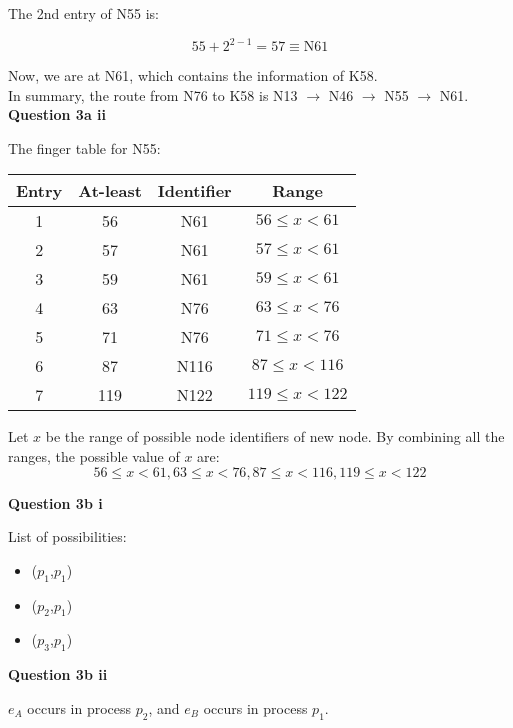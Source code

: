 \documentclass[11pt,a4paper]{report}
\begin{document}
\begin{multicols*}{2}
\noindent The 2nd entry of N55 is:

$$55 + 2^{2-1} = 57 \equiv \text{N61}$$

\noindent Now, we are at N61, which contains the information of K58. \\

\noindent In summary, the route from N76 to K58 is N13 $\rightarrow$ N46 $\rightarrow$ N55 $\rightarrow$ N61.\\

\noindent \textbf{Question 3a ii}

\noindent The finger table for N55:

\begin{center}
\begin{tabular}{|c|c|c|c|}
  \hline
  Entry & At-least & Identifier & Range\\ \hline
  1     & 56       & N61        & $56\le x <61$\\
  2     & 57       & N61        & $57\le x <61$\\
  3     & 59       & N61        & $59\le x <61$\\
  4     & 63       & N76        & $63\le x <76$\\
  5     & 71       & N76        & $71\le x <76$\\
  6     & 87       & N116       & $87\le x <116$\\
  7     & 119      & N122       & $119\le x <122$\\ \hline
\end{tabular}
\end{center}

\noindent Let $x$ be the range of possible node identifiers of new node. By combining all the ranges, the possible value of $x$ are:
$$56\le x <61, 63\le x <76,87\le x <116,119\le x <122$$

\noindent \textbf{Question 3b i}

\noindent List of possibilities:
\begin{itemize}
  \item ($p_1$,$p_1$)
  \item ($p_2$,$p_1$)
  \item ($p_3$,$p_1$)
\end{itemize}

\noindent \textbf{Question 3b ii}

\noindent $e_A$ occurs in process $p_2$, and $e_B$ occurs in process $p_1$.

\begin{center}
\end{center}
\end{multicols*}
\end{document}
